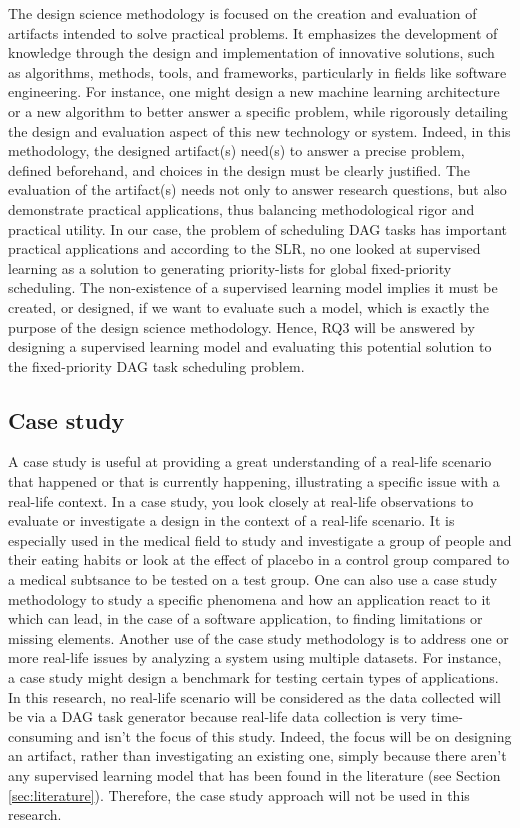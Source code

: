 The design science methodology is focused on the creation and evaluation 
of artifacts intended to solve practical problems. It emphasizes 
the development of knowledge through the design and implementation 
of innovative solutions, such as algorithms, methods, tools, 
and frameworks, particularly in fields like software engineering\cite{Wieringa2010DesignScienceMethod}.
For instance, one might design a new machine learning architecture or a new algorithm to 
better answer a specific problem, while rigorously detailing the design and evaluation aspect of this new technology or system.
Indeed, in this methodology,
the designed artifact(s) need(s) to answer a precise problem,
defined beforehand, and choices in the design must be clearly justified.
The evaluation of the artifact(s) needs not only to answer research questions, but also
demonstrate practical applications,
thus balancing methodological rigor and practical utility.
In our case, the problem of scheduling DAG tasks
has important practical applications and according to the SLR, 
no one looked at supervised learning as a solution to generating priority-lists for 
global fixed-priority scheduling.
The non-existence of a supervised learning model implies it must be created, or designed,
if we want to evaluate such a model,
which is exactly the purpose of the design science methodology.
Hence, RQ3 will be answered by designing a supervised learning model and evaluating this potential solution to the fixed-priority DAG task scheduling problem.

\subsection{Case study}

A case study is useful at providing a great understanding of a real-life scenario that happened 
or that is currently happening, illustrating a specific issue with a real-life context.
In a case study, you look closely at real-life observations to evaluate or investigate
a design in the context of a real-life scenario\cite{sarah2011caseStudy}.
It is especially used in the medical field to study and investigate a group of people and their 
eating habits or look at the effect of placebo in a control group compared to a medical subtsance to be tested
on a test group.
One can also use a case study methodology to study a specific phenomena and how an application react to it
which can lead, in the case of a software application, to finding
limitations or missing elements.
Another use of the case study methodology is 
to address one or more real-life issues by analyzing 
a system using multiple datasets.
For instance, a case study might design a benchmark for testing 
certain types of applications.
In this research, no real-life scenario will be considered as 
the data collected will be via a DAG task generator because real-life data collection is very time-consuming
and isn't the focus of this study.
Indeed, the focus will be on designing an artifact,
rather than investigating an existing one, simply because there aren't any supervised 
learning model that has been found in the literature (see Section \ref{sec:literature}). 
Therefore, the case study approach will not be used in this research.

